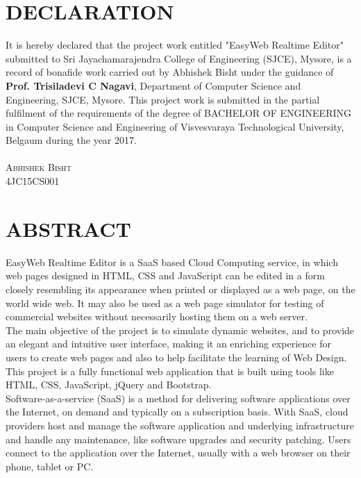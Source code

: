 \documentclass[12pt,a4paper]{article}
\begin{document}
\section*{\huge DECLARATION}

It is hereby declared that the project work entitled "EasyWeb Realtime Editor" submitted to Sri Jayachamarajendra College of Engineering (SJCE), Mysore, is a record of bonafide work carried out by Abhishek Bisht under the guidance of \textbf{Prof. Trisiladevi C Nagavi}, Department of Computer Science and Engineering, SJCE, Mysore. This project work is submitted in the partial fulfilment of the requirements of the degree of BACHELOR OF ENGINEERING in Computer Science and Engineering of Visvesvaraya Technological University, Belgaum during the year 2017.\\
\\
\textsc{\large Abhishek Bisht\\4JC15CS001}

\newpage
\linespread{1.6}
\section*{\huge ABSTRACT}


EasyWeb Realtime Editor is a SaaS based Cloud Computing service, in which web pages designed in HTML, CSS and JavaScript can be edited in a form closely resembling its appearance when printed or displayed  as a web page, on the world wide web. It may also be used as a web page simulator for testing of commercial websites without necessarily hosting them on a web server. \cite{SaaS}\\

The main objective of the project is to simulate dynamic websites, and to provide an elegant and intuitive user interface, making it an enriching experience for users to create web pages and also to help facilitate the learning of Web Design.\\

This project is a fully functional web application that is built using tools like HTML, CSS, JavaScript, jQuery and Bootstrap.\\

Software-as-a-service (SaaS) is a method for delivering software applications over the Internet, on demand and typically on a subscription basis. With SaaS, cloud providers host and manage the software application and underlying infrastructure and handle any maintenance, like software upgrades and security patching. Users connect to the application over the Internet, usually with a web browser on their phone, tablet or PC.\cite{SaaS}\\
\end{document}
